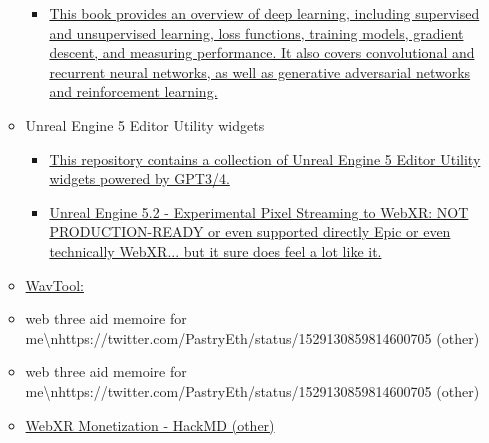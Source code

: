 \begin{itemize}
\begin{itemize}
\begin{itemize}
    \item
      \href{https://udlbook.github.io/udlbook/}{This book provides an
      overview of deep learning, including supervised and unsupervised
      learning, loss functions, training models, gradient descent, and
      measuring performance. It also covers convolutional and recurrent
      neural networks, as well as generative adversarial networks and
      reinforcement learning.}
    \end{itemize}
  \item
    Unreal Engine 5 Editor Utility widgets

    \begin{itemize}
     
    \item
      \href{https://github.com/TREE-Ind/UnrealGPT}{This repository
      contains a collection of Unreal Engine 5 Editor Utility widgets
      powered by GPT3/4.}
    \item
      \href{https://www.youtube.com/watch?v=FQgsQLodcZM}{Unreal Engine
      5.2 - Experimental Pixel Streaming to WebXR: NOT PRODUCTION-READY
      or even supported directly Epic or even technically WebXR... but
      it sure does feel a lot like it.}
    \end{itemize}
  \item
    \href{http://WavTool.com}{WavTool:}
  \item
    web three aid memoire for
    me\textbackslash nhttps://twitter.com/PastryEth/status/1529130859814600705
    (other)
  \item
    web three aid memoire for
    me\textbackslash nhttps://twitter.com/PastryEth/status/1529130859814600705
    (other)
  \item
    \href{https://hackmd.io/@xr/monetization}{WebXR Monetization -
    HackMD (other)}

    \begin{itemize}
     

\end{itemize}
\end{itemize}
\end{itemize}
